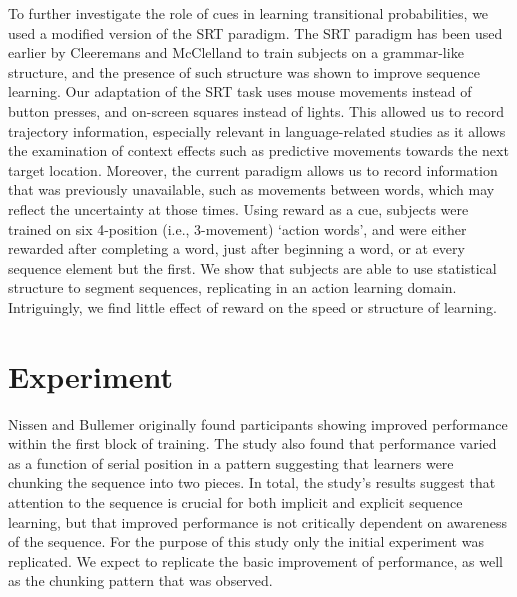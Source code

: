 \documentclass[conference]{IEEEtran}
\begin{document}
To further investigate the role of cues in learning transitional probabilities, we used a modified version of the SRT paradigm. The SRT paradigm has been used earlier by Cleeremans and McClelland \cite{Cleeremans:1991} to train subjects on a grammar-like structure, and the presence of such structure was shown to improve sequence learning. Our adaptation of the SRT task uses mouse movements instead of button presses, and on-screen squares instead of lights. This allowed us to record trajectory information, especially relevant in language-related studies as it allows the examination of context effects such as predictive movements towards the next target location. Moreover, the current paradigm allows us to record information that was previously unavailable, such as movements between words, which may reflect the uncertainty at those times. Using reward as a cue, subjects were trained on six 4-position (i.e., 3-movement) `action words', and were either rewarded after completing a word, just after beginning a word, or at every sequence element but the first. We show that subjects are able to use statistical structure to segment sequences, replicating \cite{Saffran:1996} in an action learning domain. Intriguingly, we find little effect of reward on the speed or structure of learning.


\section{Experiment}

Nissen and Bullemer \cite{Nissen:1987} originally found participants showing improved performance within the first block of training. The study also found that performance varied as a function of serial position in a pattern suggesting that learners were chunking the sequence into two pieces. In total, the study's results suggest that attention to the sequence is crucial for both implicit and explicit sequence learning, but that improved performance is not critically dependent on awareness of the sequence. For the purpose of this study only the initial experiment was replicated. We expect to replicate the basic improvement of performance, as well as the chunking pattern that was observed. 
\end{document}
